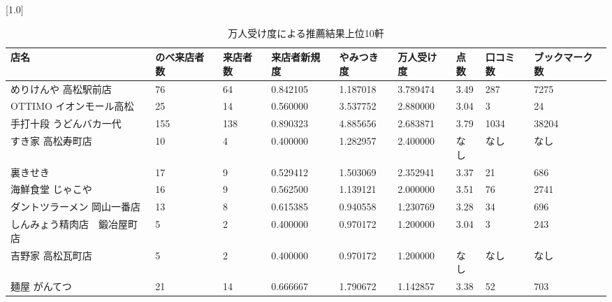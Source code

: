 \begin{table}[H]
\caption{万人受け度による推薦結果上位10軒}
\label{table:acceptability}
\small
\scalebox{0.7}[1.0]{
\begin{tabular}{|l|l|l|l|l|l|l|l|l|}
\hline
店名              & のべ来店者数 & 来店者数 & 来店者新規度   & やみつき度    & 万人受け度    & 点数   & 口コミ数 & ブックマーク数 \\ \hline
めりけんや 高松駅前店     & 76     & 64   & 0.842105 & 1.187018 & 3.789474 & 3.49 & 287  & 7275    \\ \hline
OTTIMO イオンモール高松 & 25     & 14   & 0.560000 & 3.537752 & 2.880000 & 3.04 & 3    & 24      \\ \hline
手打十段 うどんバカ一代    & 155    & 138  & 0.890323 & 4.885656 & 2.683871 & 3.79 & 1034 & 38204   \\ \hline
すき家 高松寿町店       & 10     & 4    & 0.400000 & 1.282957 & 2.400000 & なし   & なし   & なし      \\ \hline
裏きせき            & 17     & 9    & 0.529412 & 1.503069 & 2.352941 & 3.37 & 21   & 686     \\ \hline
海鮮食堂 じゃこや       & 16     & 9    & 0.562500 & 1.139121 & 2.000000 & 3.51 & 76   & 2741    \\ \hline
ダントツラーメン 岡山一番店  & 13     & 8    & 0.615385 & 0.940558 & 1.230769 & 3.28 & 34   & 696     \\ \hline
しんみょう精肉店　鍛冶屋町店  & 5      & 2    & 0.400000 & 0.970172 & 1.200000 & 3.04 & 3    & 243     \\ \hline
吉野家 高松瓦町店       & 5      & 2    & 0.400000 & 0.970172 & 1.200000 & なし   & なし   & なし      \\ \hline
麺屋 がんてつ         & 21     & 14   & 0.666667 & 1.790672 & 1.142857 & 3.38 & 52   & 703     \\ \hline
\end{tabular}
}
\end{table}
